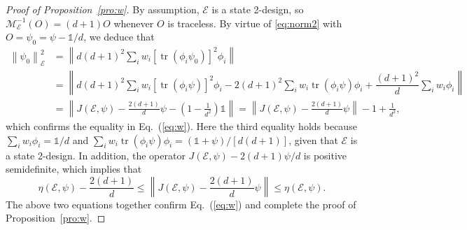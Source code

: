 \documentclass[aps,pra,twocolumn,nofootinbib,superscriptaddress,10pt]{revtex4-2}
\DeclareMathOperator{\tr}{tr}
\newcommand{\bbone}{\mathds{1}}
\newcommand{\caE}{\mathcal{E}}
\newcommand{\caM}{\mathcal{M}}
\newcommand{\eref}[1]{Eq.~\textup{(\ref{#1})}}
\newcommand{\pref}[1]{Proposition~\ref{#1}}
\begin{document}
\begin{proof}[Proof of \pref{pro:w}]
By assumption, $\caE$ is a state 2-design, so $\caM_\caE^{-1}(O)=(d+1)O$ whenever $O$ is traceless. By virtue of \eqref{eq:norm2} with $O=\psi_0=\psi-\bbone/d$, we deduce that
\begin{align}
   \left\|\psi_0\right\|_\caE^2&=\left\|d(d+1)^2\sum_iw_i\left[\tr\left (  \phi_{i}\psi_0\right )\right]^2\phi_{i}\right\| \nonumber\\&=\left\|d(d+1)^2\sum_iw_i\left[\tr\left (  \phi_i\psi\right )\right]^2\phi_i-2(d+1)^2\sum_iw_i\tr\left (  \phi_i\psi\right )\phi_i+\dfrac{(d+1)^2}{d}\sum_iw_i\phi_i\right\|
  \nonumber\\
  &=\left\|J(\caE,\psi)-\frac{2(d+1)}{d}\psi-\left(1-\frac{1}{d^2}\right)\bbone\right\|=\left\|J(\caE,\psi)-\frac{2(d+1)}{d}\psi\right\|-1+\frac{1}{d^2},
\label{eq:CRFE_norm_fidelity}
\end{align}
which confirms the equality in \eref{eq:w}. Here the third equality holds because $\sum_iw_i\phi_i={\bbone}/{d}$ and $\sum_iw_i\tr\left(\phi_i\psi\right)\phi_i={(\bbone+\psi)}/{[d(d+1)]}$, given that $\caE$ is a state 2-design. In addition, the operator $J(\caE,\psi)-2(d+1)\psi/d$ is positive semidefinite, which implies that 
\begin{equation}
\eta(\caE,\psi)-  \frac{2(d+1)}{d} \leq  \left\|J(\caE,\psi)-\frac{2(d+1)}{d}\psi\right\|\leq \eta(\caE,\psi).
\end{equation}
The above two equations together confirm \eref{eq:w} and complete the proof of \pref{pro:w}.
\end{proof}
\end{document}
